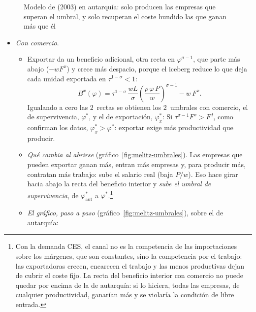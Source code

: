 \documentclass[11pt]{article}
\begin{document}
\begin{figure}[H]
\centering
\caption{Modelo de  (2003) en autarquía: solo producen las empresas que superan el umbral, y solo recuperan el coste hundido las que ganan más que él}\label{fig:melitz-autarquia}
\end{figure}

\begin{itemize}
\item \emph{Con comercio}.
  \begin{itemize}
  \item Exportar da un beneficio adicional, otra recta en $\varphi^{\sigma-1}$, que parte más abajo ($-wF^x$) y crece más despacio, porque el iceberg reduce lo que deja cada unidad exportada en $\tau^{1-\sigma}<1$:
  $$B^x(\varphi)=\tau^{1-\sigma}\,\frac{wL}{\sigma}\left(\frac{\rho\,\varphi\,P}{w}\right)^{\sigma-1}-w\,F^x.$$
  Igualando a cero las 2~rectas se obtienen los 2~umbrales con comercio, el de supervivencia, $\varphi^*$, y el de exportación, $\varphi^*_x$:
  Si $\tau^{\sigma-1}F^x>F^d$, como confirman los datos, $\varphi^*_x>\varphi^*$: exportar exige más productividad que producir.
  \item \emph{Qué cambia al abrirse} (gráfico~\ref{fig:melitz-umbrales}). Las empresas que pueden exportar ganan más, entran más empresas y, para producir más, contratan más trabajo: sube el salario real (baja $P/w$). Eso hace girar hacia abajo la recta del beneficio interior y \emph{sube el umbral de supervivencia}, de $\varphi^*_{\mathrm{aut}}$ a $\varphi^*$.\footnote{Con la demanda CES, el canal no es la competencia de las importaciones sobre los márgenes, que son constantes, sino la competencia por el trabajo: las exportadoras crecen, encarecen el trabajo y las menos productivas dejan de cubrir el coste fijo\nocite{Melitz2003Impact}. La recta del beneficio interior con comercio no puede quedar por encima de la de autarquía: si lo hiciera, todas las empresas, de cualquier productividad, ganarían más y se violaría la condición de libre entrada\nocite{MelitzRedding2014Heterogeneous}.} 
  \item \emph{El gráfico, paso a paso} (gráfico~\ref{fig:melitz-umbrales}), sobre el de autarquía:
    \begin{enumerate}

\end{enumerate}
\end{itemize}
\end{itemize}
\end{document}
